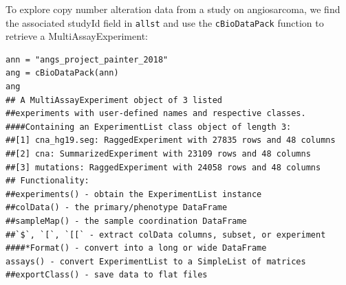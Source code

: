 
To explore copy number alteration data from a study on angiosarcoma,
we find the associated studyId field in \texttt{allst} and use the \texttt{cBioDataPack} function
to retrieve a MultiAssayExperiment:

\begin{shaded}
\begin{verbatim}
ann = "angs_project_painter_2018"
ang = cBioDataPack(ann)
ang
## A MultiAssayExperiment object of 3 listed
##experiments with user-defined names and respective classes.
####Containing an ExperimentList class object of length 3:
##[1] cna_hg19.seg: RaggedExperiment with 27835 rows and 48 columns
##[2] cna: SummarizedExperiment with 23109 rows and 48 columns
##[3] mutations: RaggedExperiment with 24058 rows and 48 columns
## Functionality:
##experiments() - obtain the ExperimentList instance
##colData() - the primary/phenotype DataFrame
##sampleMap() - the sample coordination DataFrame
##`$`, `[`, `[[` - extract colData columns, subset, or experiment
####*Format() - convert into a long or wide DataFrame
assays() - convert ExperimentList to a SimpleList of matrices
##exportClass() - save data to flat files
\end{verbatim}
\end{shaded}

